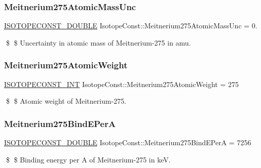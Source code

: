 \subsubsection{\texorpdfstring{Meitnerium275\+Atomic\+Mass\+Unc}{Meitnerium275AtomicMassUnc}}
{\footnotesize\ttfamily \mbox{\hyperlink{group___isotope_const-_macros_ga8f45a7272ce02c0b4c65c44636ed719a}{I\+S\+O\+T\+O\+P\+E\+C\+O\+N\+S\+T\+\_\+\+D\+O\+U\+B\+LE}} Isotope\+Const\+::\+Meitnerium275\+Atomic\+Mass\+Unc = 0.}

\$ \$ Uncertainty in atomic mass of Meitnerium-\/275 in amu. \mbox{\label{group___isotope_const-_meitnerium-_mt275_ga0135eb5663df8bccbcc31d328793789c}} 
\subsubsection{\texorpdfstring{Meitnerium275\+Atomic\+Weight}{Meitnerium275AtomicWeight}}
{\footnotesize\ttfamily \mbox{\hyperlink{group___isotope_const-_macros_ga5f18360b3e99483a35c32d789e62621c}{I\+S\+O\+T\+O\+P\+E\+C\+O\+N\+S\+T\+\_\+\+I\+NT}} Isotope\+Const\+::\+Meitnerium275\+Atomic\+Weight = 275}

\$ \$ Atomic weight of Meitnerium-\/275. \mbox{\label{group___isotope_const-_meitnerium-_mt275_ga1d520038597448f94bcfd04cfc62a062}} 
\subsubsection{\texorpdfstring{Meitnerium275\+Bind\+E\+PerA}{Meitnerium275BindEPerA}}
{\footnotesize\ttfamily \mbox{\hyperlink{group___isotope_const-_macros_ga8f45a7272ce02c0b4c65c44636ed719a}{I\+S\+O\+T\+O\+P\+E\+C\+O\+N\+S\+T\+\_\+\+D\+O\+U\+B\+LE}} Isotope\+Const\+::\+Meitnerium275\+Bind\+E\+PerA = 7256}

\$ \$ Binding energy per A of Meitnerium-\/275 in keV. \mbox{\label{group___isotope_const-_meitnerium-_mt275_ga6c57c28cc959f1e8ee5b628fa0c7a74e}} 

